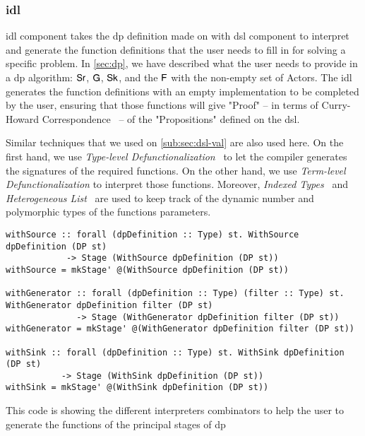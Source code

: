 \subsubsection{\acrfull{idl}}
\acrshort{idl} component takes the \acrshort{dp} definition made on with \acrshort{dsl} component to interpret and generate the function definitions
that the user needs to fill in for solving a specific problem. In \autoref{sec:dp}, we have described what the user needs to provide in a \acrshort{dp} algorithm: $\mathsf{Sr}$, $\mathsf{G}$, $\mathsf{Sk}$, and the $\mathsf{F}$ with the non-empty set of Actors.
The \acrshort{idl} generates the function definitions with an empty implementation to be completed by the user, ensuring that those functions will give "Proof" -- in terms of Curry-Howard Correspondence~\cite{curryhoward} --  of the "Propositions" defined on the \acrshort{dsl}.

Similar techniques that we used on \autoref{sub:sec:dsl-val} are also used here. 
On the first hand, we use \emph{Type-level Defunctionalization}~\cite{defunctionalization, fun-type-function-haskell} to let the compiler generates the signatures of the required functions. 
On the other hand, we use \emph{Term-level Defunctionalization} to interpret those functions.
Moreover, \emph{Indexed Types}~\cite{type-index} and \emph{Heterogeneous List}~\cite{hlist} are used to keep track of the dynamic number and polymorphic types of the functions parameters. 

\begin{listing}[H]
  \begin{verbatim}
withSource :: forall (dpDefinition :: Type) st. WithSource dpDefinition (DP st) 
            -> Stage (WithSource dpDefinition (DP st))
withSource = mkStage' @(WithSource dpDefinition (DP st))

withGenerator :: forall (dpDefinition :: Type) (filter :: Type) st. WithGenerator dpDefinition filter (DP st) 
              -> Stage (WithGenerator dpDefinition filter (DP st))
withGenerator = mkStage' @(WithGenerator dpDefinition filter (DP st))

withSink :: forall (dpDefinition :: Type) st. WithSink dpDefinition (DP st) 
           -> Stage (WithSink dpDefinition (DP st))
withSink = mkStage' @(WithSink dpDefinition (DP st))
  \end{verbatim}
  \caption[{[\texttt{Stage.hs}] Using with Interpreters of \acrshort{dp} encoded in $G_{dsl}$}]{This code is showing the different interpreters combinators to help the user to generate the functions of the principal stages of \acrshort{dp}}
  \label{src:dpfh:6}
\end{listing}

